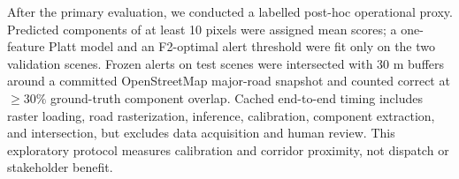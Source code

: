 After the primary evaluation, we conducted a labelled post-hoc operational proxy. Predicted components of at least 10 pixels were assigned mean scores; a one-feature Platt model and an F2-optimal alert threshold were fit only on the two validation scenes. Frozen alerts on test scenes were intersected with 30 m buffers around a committed OpenStreetMap major-road snapshot and counted correct at $\ge30\%$ ground-truth component overlap. Cached end-to-end timing includes raster loading, road rasterization, inference, calibration, component extraction, and intersection, but excludes data acquisition and human review. This exploratory protocol measures calibration and corridor proximity, not dispatch or stakeholder benefit.
